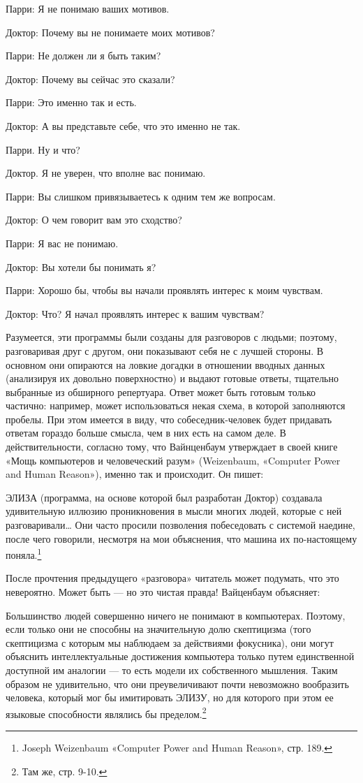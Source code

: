 \documentclass[../main.tex]{subfiles}
\begin{document}
Парри: Я не понимаю ваших мотивов.

Доктор: Почему вы не понимаете моих мотивов?

Парри: Не должен ли я быть таким?

Доктор: Почему вы сейчас это сказали?

Парри: Это именно так и есть.

Доктор: А вы представьте себе, что это именно не так.

Парри. Ну и что?

Доктор. Я не уверен, что вполне вас понимаю.

Парри: Вы слишком привязываетесь к одним тем же вопросам.

Доктор: О чем говорит вам это сходство?

Парри: Я вас не понимаю.

Доктор: Вы хотели бы понимать я?

Парри: Хорошо бы, чтобы вы начали проявлять интерес к моим чувствам.

Доктор: Что? Я начал проявлять интерес к вашим чувствам?

Разумеется, эти программы были созданы для разговоров с людьми; поэтому, разговаривая друг с другом, они показывают себя не с лучшей стороны. В основном они опираются на ловкие догадки в отношении вводных данных (анализируя их довольно поверхностно) и выдают готовые ответы, тщательно выбранные из обширного репертуара. Ответ может быть готовым только частично: например, может использоваться некая схема, в которой заполняются пробелы. При этом имеется в виду, что собеседник-человек будет придавать ответам гораздо больше смысла, чем в них есть на самом деле. В действительности, согласно тому, что Вайнценбаум утверждает в своей книге «Мощь компьютеров и человеческий разум» (Weizenbaum, «Computer Power and Human Reason»), именно так и происходит. Он пишет:

ЭЛИЗА (программа, на основе которой был разработан Доктор) создавала удивительную иллюзию проникновения в мысли многих людей, которые с ней разговаривали\ldots{} Они часто просили позволения побеседовать с системой наедине, после чего говорили, несмотря на мои объяснения, что машина их по-настоящему поняла.\footnote{Joseph Weizenbaum «Computer Power and Human Reason», стр. 189.}

После прочтения предыдущего «разговора» читатель может подумать, что это невероятно. Может быть --- но это чистая правда! Вайценбаум объясняет:

Большинство людей совершенно ничего не понимают в компьютерах. Поэтому, если только они не способны на значительную долю скептицизма (того скептицизма с которым мы наблюдаем за действиями фокусника), они могут объяснить интеллектуальные достижения компьютера только путем единственной доступной им аналогии --- то есть модели их собственного мышления. Таким образом не удивительно, что они преувеличивают почти невозможно вообразить человека, который мог бы имитировать ЭЛИЗУ, но для которого при этом ее языковые способности являлись бы пределом.\footnote{Там же, стр. 9-10.}
\end{document}
